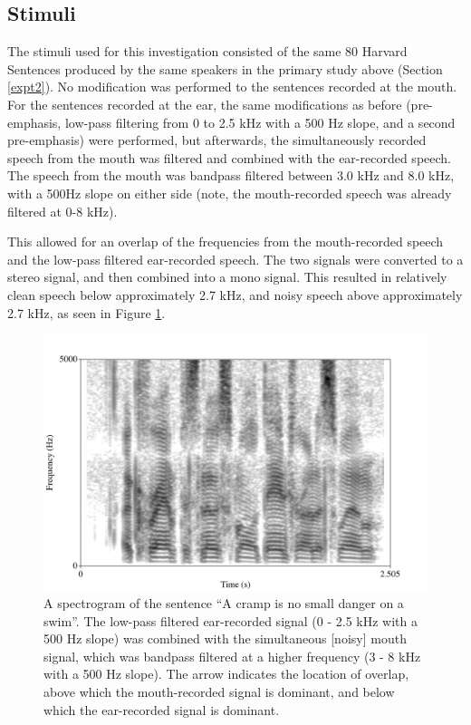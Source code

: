 \subsection{Stimuli}\label{F0-stimuli}

The stimuli used for this investigation consisted of the same 80 Harvard Sentences produced by the same speakers in the primary study above (Section \ref{expt2}).
No modification was performed to the sentences recorded at the mouth.  For the sentences recorded at the ear, the same modifications as before (pre-emphasis, low-pass filtering from 0 to 2.5 kHz with a 500 Hz slope, and a second pre-emphasis) were performed, but afterwards, the simultaneously recorded speech from the mouth was filtered and combined with the ear-recorded speech.  The speech from the mouth was bandpass filtered between 3.0 kHz and 8.0 kHz, with a 500Hz slope on either side (note, the mouth-recorded speech was already filtered at 0-8 kHz).  

This allowed for an overlap of the frequencies from the mouth-recorded speech and the low-pass filtered ear-recorded speech.  The two signals were converted to a stereo signal, and then combined into a mono signal.  This resulted in relatively clean speech below approximately 2.7 kHz, and noisy speech above approximately 2.7 kHz, as seen in Figure \ref{fig:combined-signal}.

\begin{figure}[h]
\centering
  \includegraphics[width=\textwidth]{figure/combined-signal.png}
  \caption{A spectrogram of the sentence ``A cramp is no small danger on a swim''.  The low-pass filtered ear-recorded signal (0 - 2.5 kHz with a 500 Hz slope) was combined with the simultaneous [noisy] mouth signal, which was bandpass filtered at a higher frequency (3 - 8 kHz with a 500 Hz slope).  The arrow indicates the location of overlap, above which the mouth-recorded signal is dominant, and below which the ear-recorded signal is dominant.}
  \label{fig:combined-signal}
\end{figure}
%

